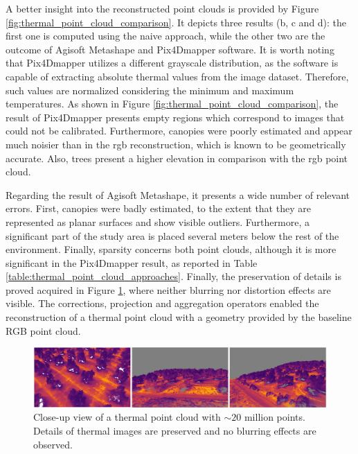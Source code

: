 A better insight into the reconstructed point clouds is provided by Figure \ref{fig:thermal_point_cloud_comparison}. It depicts three results (b, c and d): the first one is computed using the naive approach, while the other two are the outcome of Agisoft Metashape and Pix4Dmapper software. It is worth noting that Pix4Dmapper utilizes a different grayscale distribution, as the software is capable of extracting absolute thermal values from the image dataset. Therefore, such values are normalized considering the minimum and maximum temperatures. As shown in Figure \ref{fig:thermal_point_cloud_comparison}, the result of Pix4Dmapper presents empty regions which correspond to images that could not be calibrated. Furthermore, canopies were poorly estimated and appear much noisier than in the \acrshort{rgb} reconstruction, which is
known to be geometrically accurate. Also, trees present a higher elevation in comparison with the \acrshort{rgb} point cloud. 

Regarding the result of Agisoft Metashape, it presents a wide number of relevant errors. First, canopies were badly estimated, to the extent that they are represented as planar surfaces and show visible outliers. Furthermore, a significant part of the study area is placed several meters below the rest of the environment. Finally, sparsity concerns both point clouds, although it is more significant in the Pix4Dmapper result, as reported in Table \ref{table:thermal_point_cloud_approaches}. Finally, the preservation of details is proved acquired in Figure \ref{fig:thermal_zoomed_up}, where neither blurring nor distortion effects are visible. The corrections, projection and aggregation operators enabled the reconstruction of a thermal point cloud with a geometry provided by the baseline RGB point cloud.

\begin{figure}[hbt]
	\centering
    \includegraphics[width=\linewidth]{figs/thermal_projection/thermal_close_view.png}
	\caption{Close-up view of a thermal point cloud with $\sim20$ million points. Details of thermal images are preserved and no blurring effects are observed.}
	\label{fig:thermal_zoomed_up}
\end{figure}

